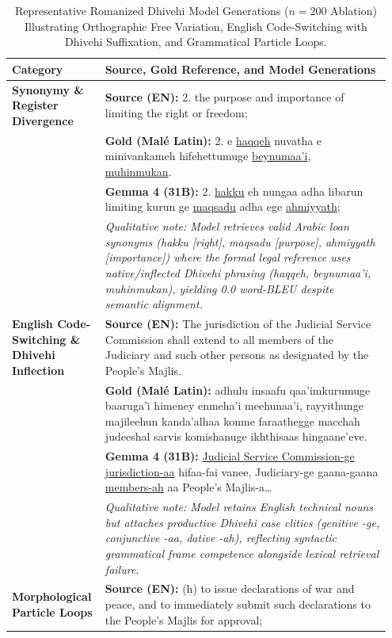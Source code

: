 \documentclass[acmsmall,review,anonymous]{acmart}
\begin{document}
\begin{table}[t]
\centering
\small
\caption{Representative Romanized Dhivehi Model Generations ($n=200$ Ablation) Illustrating Orthographic Free Variation, English Code-Switching with Dhivehi Suffixation, and Grammatical Particle Loops.}
\label{tab:romanized_examples}
\begin{tabular}{p{0.22\linewidth} p{0.73\linewidth}}
\toprule
\textbf{Category} & \textbf{Source, Gold Reference, and Model Generations} \\
\midrule
\textbf{Synonymy \& Register Divergence} & \textbf{Source (EN):} 2. the purpose and importance of limiting the right or freedom; \\
& \textbf{Gold (Mal\'{e} Latin):} 2. e \underline{haqqeh} nuvatha e minivankameh hifehettumuge \underline{beynumaa'i}, \underline{muhinmukan}. \\
& \textbf{Gemma 4 (31B):} 2. \underline{hakku} eh nungaa adha libarun limiting kurun ge \underline{maqsadu} adha ege \underline{ahmiyyath}; \\
& \textit{\footnotesize Qualitative note: Model retrieves valid Arabic loan synonyms (\textit{hakku} [right], \textit{maqsadu} [purpose], \textit{ahmiyyath} [importance]) where the formal legal reference uses native/inflected Dhivehi phrasing (\textit{haqqeh}, \textit{beynumaa'i}, \textit{muhinmukan}), yielding 0.0 word-BLEU despite semantic alignment.} \\
\midrule
\textbf{English Code-Switching \& Dhivehi Inflection} & \textbf{Source (EN):} The jurisdiction of the Judicial Service Commission shall extend to all members of the Judiciary and such other persons as designated by the People's Majlis. \\
& \textbf{Gold (Mal\'{e} Latin):} adhulu insaafu qaa'imkurumuge baaruga'i himeney enmeha'i meehunaa'i, rayyithunge majileehun kanda'alhaa konme faraathegge macchah judeeshal sarvis komishanuge ikhthisaas hingaane'eve. \\
& \textbf{Gemma 4 (31B):} \underline{Judicial Service Commission-ge} \underline{jurisdiction-aa} hifaa-fai vanee, Judiciary-ge gaana-gaana \underline{members-ah} aa People's Majlis-a\dots \\
& \textit{\footnotesize Qualitative note: Model retains English technical nouns but attaches productive Dhivehi case clitics (genitive \textit{-ge}, conjunctive \textit{-aa}, dative \textit{-ah}), reflecting syntactic grammatical frame competence alongside lexical retrieval failure.} \\
\midrule
\textbf{Morphological Particle Loops} & \textbf{Source (EN):} (h) to issue declarations of war and peace, and to immediately submit such declarations to the People's Majlis for approval; \\

\end{tabular}
\end{table}
\end{document}
